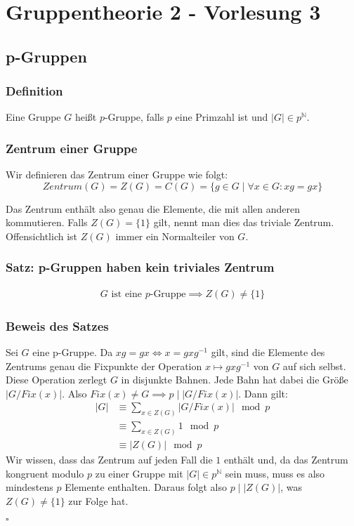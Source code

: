 \documentclass[12pt, german]{article}
\newcommand{\N}{\mathbb{N}}
\newcommand{\bewiesen}{
	
	\begin{flushright}
		$\square$  \\
\end{flushright}}
\begin{document}
	\section{Gruppentheorie 2 - Vorlesung 3}
	\subsection{p-Gruppen}
	\subsubsection{Definition}
	Eine Gruppe $G$ hei\ss t $p$-Gruppe, falls $p$ eine Primzahl ist und $|G| \in p^{\mathbb N}$.
	
	\subsubsection{Zentrum einer Gruppe}
	Wir definieren das Zentrum einer Gruppe wie folgt: $$Zentrum(G)= Z(G) = C(G) = \{g \in G \mid  \forall x \in G: xg = gx\}$$
	
	Das Zentrum enthält also genau die Elemente, die mit allen anderen kommutieren.
	Falls $Z(G)=\{1\}$ gilt, nennt man dies das triviale Zentrum.
	Offensichtlich ist $Z(G)$ immer ein Normalteiler von $G$.
	
	\subsubsection{Satz: p-Gruppen haben kein triviales Zentrum}
	\begin{align*}
		G \text{ ist eine $p$-Gruppe} \implies Z(G) \not = \{1\}
	\end{align*}
	
	\subsubsection{Beweis des Satzes}
	Sei $G$ eine p-Gruppe. Da $xg=gx \iff x=gxg^{-1}$ gilt, sind die Elemente des Zentrums genau die Fixpunkte der Operation $x \mapsto gxg^{-1}$ von $G$ auf sich selbst. Diese Operation zerlegt $G$ in disjunkte Bahnen. Jede Bahn hat dabei die Grö\ss e $|G/Fix(x)|$. 
	Also $Fix(x) \not= G \implies p \mid |G/Fix(x)|$. Dann gilt: 
	\begin{align*}
		|G| &\equiv \sum_{x \in Z(G)} |G/Fix(x)|  \mod p\\
		&\equiv \sum_{x \in Z(G)} 1  \mod p\\
		&\equiv |Z(G) |\mod p
	\end{align*}
	Wir wissen, dass das Zentrum auf jeden Fall die $1$ enthält und, da das Zentrum kongruent modulo $p$ zu einer Gruppe mit $|G| \in p^{\N}$ sein muss, muss es also mindestens $p$ Elemente enthalten. Daraus folgt also $p \mid |Z(G)|$, was $Z(G) \neq \{1\}$ zur Folge hat. 
	\bewiesen
	
\end{document}
